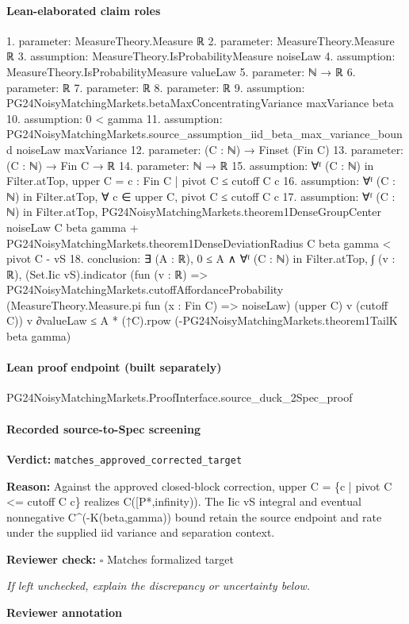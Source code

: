 \documentclass[10pt]{article}
\newcommand{\reviewerbox}{%
  \par\noindent\fbox{\parbox{0.96\linewidth}{\rule{0pt}{0.38in}}}\par
}
\newcommand{\reviewmatch}[1]{%
  \par\noindent\textbf{Reviewer check:} $\square$\; #1\par
  \noindent\emph{If left unchecked, explain the discrepancy or uncertainty below.}\par
}
\begin{document}
\paragraph{Lean-elaborated claim roles}\begin{ReviewVerbatim}
1. parameter: MeasureTheory.Measure ℝ
2. parameter: MeasureTheory.Measure ℝ
3. assumption: MeasureTheory.IsProbabilityMeasure noiseLaw
4. assumption: MeasureTheory.IsProbabilityMeasure valueLaw
5. parameter: ℕ → ℝ
6. parameter: ℝ
7. parameter: ℝ
8. parameter: ℝ
9. assumption: PG24NoisyMatchingMarkets.betaMaxConcentratingVariance maxVariance beta
10. assumption: 0 < gamma
11. assumption: PG24NoisyMatchingMarkets.source_assumption_iid_beta_max_variance_bound noiseLaw maxVariance
12. parameter: (C : ℕ) → Finset (Fin C)
13. parameter: (C : ℕ) → Fin C → ℝ
14. parameter: ℕ → ℝ
15. assumption: ∀ᶠ (C : ℕ) in Filter.atTop, upper C = {c : Fin C | pivot C ≤ cutoff C c}
16. assumption: ∀ᶠ (C : ℕ) in Filter.atTop, ∀ c ∈ upper C, pivot C ≤ cutoff C c
17. assumption: ∀ᶠ (C : ℕ) in Filter.atTop,
  PG24NoisyMatchingMarkets.theorem1DenseGroupCenter noiseLaw C beta gamma +
      PG24NoisyMatchingMarkets.theorem1DenseDeviationRadius C beta gamma <
    pivot C - vS
18. conclusion: ∃ (A : ℝ),
  0 ≤ A ∧
    ∀ᶠ (C : ℕ) in Filter.atTop,
      ∫ (v : ℝ),
          (Set.Iic vS).indicator
            (fun (v : ℝ) =>
              PG24NoisyMatchingMarkets.cutoffAffordanceProbability
                (MeasureTheory.Measure.pi fun (x : Fin C) => noiseLaw) (upper C) v (cutoff C))
            v ∂valueLaw ≤
        A * (↑C).rpow (-PG24NoisyMatchingMarkets.theorem1TailK beta gamma)
\end{ReviewVerbatim}

\paragraph{Lean proof endpoint (built separately)}\begin{ReviewVerbatim}
PG24NoisyMatchingMarkets.ProofInterface.source_duck_2Spec_proof
\end{ReviewVerbatim}

\paragraph{Recorded source-to-Spec screening}
\textbf{Verdict:} \texttt{matches\_approved\_corrected\_target}
\\
{\raggedright
\textbf{Reason:} Against the approved closed-\allowbreak{}block correction, upper C = \{c | pivot C <= cutoff C c\} realizes C([P*,infinity)).\allowbreak{} The Iic vS integral and eventual nonnegative C\textasciicircum{}(-\allowbreak{}K(beta,gamma)) bound retain the source endpoint and rate under the supplied iid variance and separation context.\allowbreak{}
\par}
\reviewmatch{Matches formalized target}
\noindent\textbf{Reviewer annotation}\par
\reviewerbox
\clearpage
\hypertarget{source-claim-8894ff8f48aa126b}{}
\end{document}
